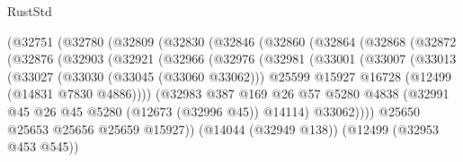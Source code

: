 \begin{lexlean}{RustStd}
\begin{coremodule}
                    (@32751
                      (@32780
                        (@32809
                          (@32830
                            (@32846
                              (@32860
                                (@32864
                                  (@32868
                                    (@32872
                                      (@32876
                                        (@32903
                                          (@32921
                                            (@32966
                                              (@32976
                                                (@32981
                                                  (@33001
                                                    (@33007
                                                      (@33013
                                                        (@33027
                                                          (@33030 (@33045 (@33060 @33062)))
                                                          @25599
                                                          @15927
                                                          @16728
                                                          (@12499 (@14831 @7830 @4886))))
                                                      (@32983
                                                        @387
                                                        @169
                                                        @26
                                                        @57
                                                        @5280
                                                        @4838
                                                        (@32991
                                                          @45
                                                          @26
                                                          @45
                                                          @5280
                                                          (@12673 (@32996 @45))
                                                          @14114)
                                                        @33062))))
                                                @25650
                                                @25653
                                                @25656
                                                @25659
                                                @15927))
                                            (@14044 (@32949 @138))
                                            (@12499 (@32953 @453 @545))

\end{coremodule}
\end{lexlean}
